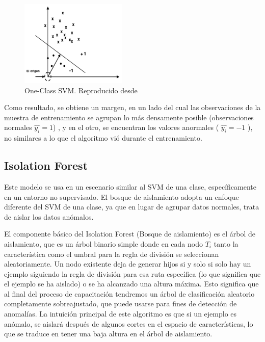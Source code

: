 \begin{figure}[h!]
  \begin{center}	\includegraphics[width=0.45\textwidth, frame]{imagenes/Cap4/oc-svm}
  \caption{One-Class SVM. Reproducido desde \protect\cite{Reference72}} 
  \label{fig:oc-svm}
  \end{center}
\end{figure}

\vspace{5mm} %

Como resultado, se obtiene un margen, en un lado del cual las observaciones de la muestra de entrenamiento se agrupan lo más densamente posible (observaciones normales $\hat{y_{i}} = 1$) , y en el otro, se encuentran los valores anormales ( $\hat{y_{i}} = -1$ ), no similares a lo que el algoritmo vi\'{o} durante el entrenamiento.


\subsection{Isolation Forest}

Este modelo se usa en un escenario similar al SVM de una clase, específicamente en un entorno no supervisado. El bosque de aislamiento adopta un enfoque diferente del SVM de una clase, ya que en lugar de agrupar datos normales, trata de aislar los datos anómalos.

\vspace{5mm} %

El componente básico del Isolation Forest (Bosque de aislamiento) es el árbol de aislamiento, que es un árbol binario simple donde en cada nodo $T_{i}$ tanto la característica como el umbral para la regla de división se seleccionan aleatoriamente. Un nodo existente deja de generar hijos si y solo si solo hay un ejemplo siguiendo la regla de división para esa ruta específica (lo que significa que el ejemplo se ha aislado) o se ha alcanzado una altura máxima. Esto significa que al final del proceso de capacitación tendremos un árbol de clasificación aleatorio completamente sobreajustado, que puede usarse para fines de detección de anomalías. La intuición principal de este algoritmo es que si un ejemplo es anómalo, se aislará después de algunos cortes en el espacio de características, lo que se traduce en tener una baja altura en el árbol de aislamiento.

